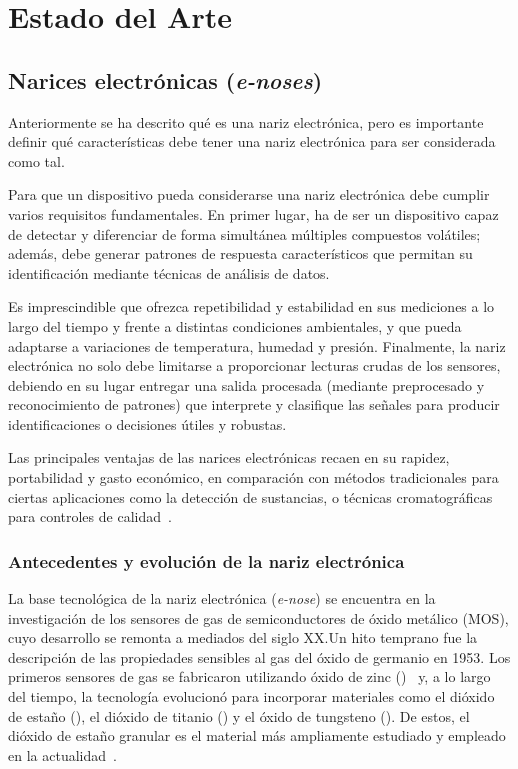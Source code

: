 \chapter{Estado del Arte}
\section{Narices electrónicas (\textit{e-noses})}
Anteriormente se ha descrito qué es una nariz electrónica, pero es importante definir qué características debe tener una nariz electrónica para ser considerada como tal.
\par

Para que un dispositivo pueda considerarse una nariz electrónica debe cumplir varios requisitos fundamentales. En primer lugar, ha de ser un dispositivo capaz de detectar y diferenciar de forma simultánea múltiples compuestos volátiles; además, debe generar patrones de respuesta característicos que permitan su identificación mediante técnicas de análisis de datos.
\par

Es imprescindible que ofrezca repetibilidad y estabilidad en sus mediciones a lo largo del tiempo y frente a distintas condiciones ambientales, y que pueda adaptarse a variaciones de temperatura, humedad y presión. Finalmente, la nariz electrónica no solo debe limitarse a proporcionar lecturas crudas de los sensores, debiendo en su lugar entregar una salida procesada (mediante preprocesado y reconocimiento de patrones) que interprete y clasifique las señales para producir identificaciones o decisiones útiles y robustas.

\newpage

Las principales ventajas de las narices electrónicas recaen en su rapidez, portabilidad y gasto económico, en comparación con métodos tradicionales para ciertas aplicaciones como la detección de sustancias, o técnicas cromatográficas para controles de calidad~\cite{BaldwinBaiPlotoDea2011,CapelliSironiDelRosso2014}.

\subsection{Antecedentes y evolución de la nariz electrónica}
La base tecnológica de la nariz electrónica (\textit{e-nose}) se encuentra en la investigación de los sensores de gas de semiconductores de óxido metálico (MOS), cuyo desarrollo se remonta a mediados del siglo XX.\@ Un hito temprano fue la descripción de las propiedades sensibles al gas del óxido de germanio en 1953. Los primeros sensores de gas se fabricaron utilizando óxido de zinc ()~\cite{Seiyama1962} y, a lo largo del tiempo, la tecnología evolucionó para incorporar materiales como el dióxido de estaño (), el dióxido de titanio () y el óxido de tungsteno (). De estos, el dióxido de estaño granular es el material más ampliamente estudiado y empleado en la actualidad~\cite{KarakayaUlucanTurkan2020,YamazoeShimanoe2008}.
\par

